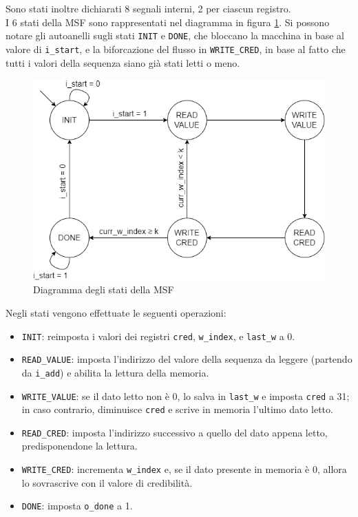 \documentclass{article}
\begin{document}
Sono stati inoltre dichiarati 8 segnali interni, 2 per ciascun registro. \\

I 6 stati della MSF sono rappresentati nel diagramma in figura \ref{fig:msf}. Si possono notare gli autoanelli sugli stati \texttt{INIT} e \texttt{DONE}, che bloccano la macchina in base al valore di \texttt{i\_start}, e la biforcazione del flusso in \texttt{WRITE\_CRED}, in base al fatto che tutti i valori della sequenza siano già stati letti o meno.

\begin{figure}[H]
    \centering
    \includegraphics[width=0.75\linewidth]{FSM.drawio.png}
    \caption{Diagramma degli stati della MSF}
    \label{fig:msf}
\end{figure}

Negli stati vengono effettuate le seguenti operazioni:

\begin{itemize}
    \item \texttt{INIT}: reimposta i valori dei registri \texttt{cred}, \texttt{w\_index}, e \texttt{last\_w} a 0.
    \item \texttt{READ\_VALUE}: imposta l'indirizzo del valore della sequenza da leggere (partendo da \texttt{i\_add}) e abilita la lettura della memoria.
    \item \texttt{WRITE\_VALUE}: se il dato letto non è 0, lo salva in \texttt{last\_w} e imposta \texttt{cred} a 31; in caso contrario, diminuisce \texttt{cred} e scrive in memoria l'ultimo dato letto.
    \item \texttt{READ\_CRED}: imposta l'indirizzo successivo a quello del dato appena letto, predisponendone la lettura.
    \item \texttt{WRITE\_CRED}: incrementa \texttt{w\_index} e, se il dato presente in memoria è 0, allora lo sovrascrive con il valore di credibilità.
    \item \texttt{DONE}: imposta \texttt{o\_done} a 1.
\end{itemize}
\end{document}
